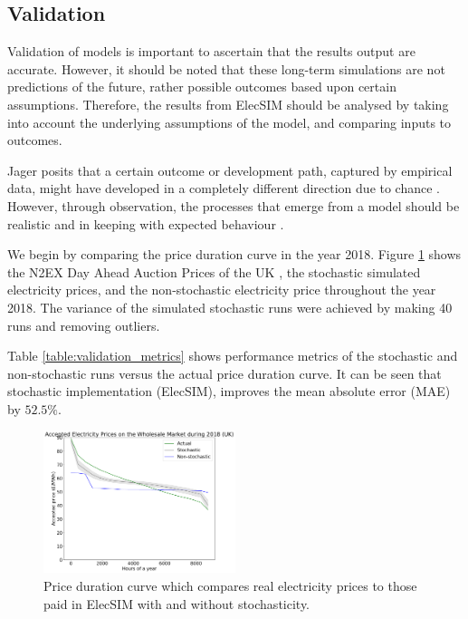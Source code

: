 
\subsection{Validation} Validation of models is important to ascertain that the results output are accurate. However, it should be noted that these long-term simulations are not predictions of the future, rather possible outcomes based upon certain assumptions. Therefore, the results from ElecSIM should be analysed by taking into account the underlying assumptions of the model, and comparing inputs to outcomes.

Jager posits that a certain outcome or development path, captured by empirical data, might have developed in a completely different direction due to chance \cite{Jager2006a}. However, through observation, the processes that emerge from a model should be realistic and in keeping with expected behaviour \cite{Jager2006}.

We begin by comparing the price duration curve in the year 2018. Figure \ref{fig:price_duration_curve} shows the N2EX Day Ahead Auction Prices of the UK \cite{nordpool_2019}, the stochastic simulated electricity prices, and the non-stochastic electricity price throughout the year 2018. The variance of the simulated stochastic runs were achieved by making 40 runs and removing outliers.

Table \ref{table:validation_metrics} shows performance metrics of the stochastic and non-stochastic runs versus the actual price duration curve. It can be seen that stochastic implementation (ElecSIM), improves the mean absolute error (MAE) by $52.5\%$.

\begin{figure}[H]
	\begin{center}
		\includegraphics[width=0.5\textwidth]{figures/load_price_duration_curve_comparison.pdf}
		\caption{Price duration curve which compares real electricity prices to those paid in ElecSIM with and without stochasticity.}
		\label{fig:price_duration_curve}
	\end{center}
\end{figure}

